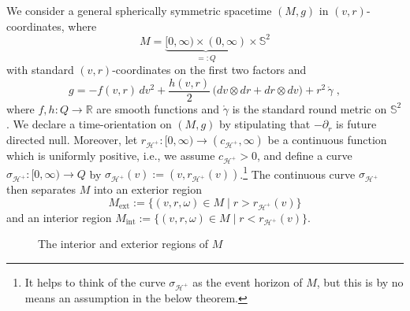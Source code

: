 \documentclass[reqno]{article}
\newcommand{\R}{\mathbb{R}}
\newcommand{\Hp}{\mathcal{H}^+}
\newcommand{\Mext}{M_{\mathrm{ext}}}
\newcommand{\rd}{\partial}
\begin{document}
We consider a general spherically symmetric spacetime $(M,g)$ in $(v,r)$-coordinates, where $$M = \underbrace{[0, \infty) \times (0, \infty)}_{=: Q} \times \mathbb{S}^2$$ with standard $(v,r)$-coordinates on the first two factors and 
\begin{equation}
\label{EqMetricVR}
g = - f(v,r) \, dv^2 + \frac{h(v,r)}{2} \, \big( dv \otimes dr + dr \otimes dv\big) + r^2 \, \mathring{\gamma} \;, 
\end{equation}
where $f , h : Q \to \R$ are smooth functions and $\mathring{\gamma}$ is the standard round metric on $\mathbb{S}^2$. We declare a time-orientation on $(M,g)$ by stipulating that $- \rd_r$ is future directed null. Moreover, let $r_{\Hp} : [0, \infty) \to (c_{\Hp},\infty)$ be a continuous function which is uniformly positive, i.e., we assume $c_{\Hp} >0$, and define a curve $\sigma_{\Hp} : [0, \infty) \to Q$ by $\sigma_{\Hp} (v) := (v, r_{\Hp}(v))$.\footnote{It helps to think of the curve $\sigma_{\Hp}$ as the event horizon of $M$, but this is by no means an assumption in the below theorem.} The continuous curve $\sigma_{\Hp}$ then separates $M $ into an exterior region $$\Mext := \{(v,r, \omega) \in M \; | \; r > r_{\Hp}(v)\}$$ and an interior region $M_{\mathrm{int}} := \{(v,r, \omega) \in M \; | \; r < r_{\Hp}(v)\}$.
\begin{figure}[h]
\centering
 \def\svgwidth{5cm}
   
      \caption{The interior and exterior regions of $M$} \label{FigGeod}
\end{figure}
\end{document}
